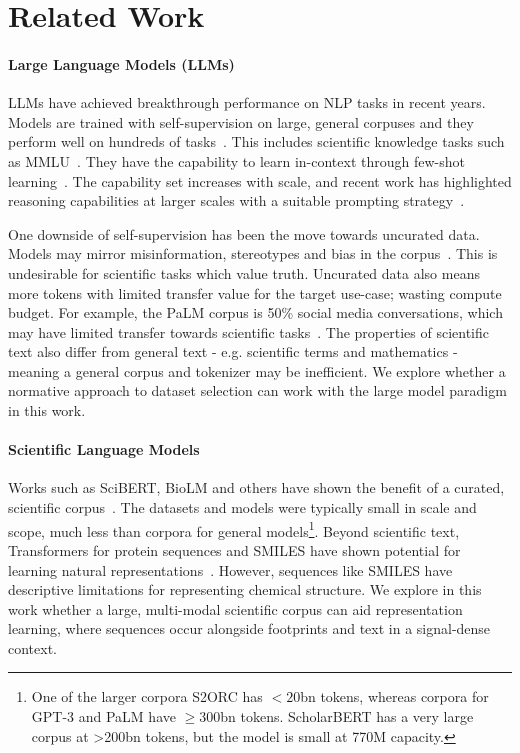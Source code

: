 \section{Related Work}

\paragraph{Large Language Models (LLMs)}LLMs have achieved breakthrough performance on NLP tasks in recent years. Models are trained with self-supervision on large, general corpuses and they perform well on hundreds of tasks~\citep{GPT3, Gopher, Chinchilla, GPTNeox, OPT, PaLM}. This includes scientific knowledge tasks such as MMLU~\citep{MMMLU}. They have the capability to learn in-context through few-shot learning~\citep{GPT3}. The capability set increases with scale, and recent work has highlighted reasoning capabilities at larger scales with a suitable prompting strategy~\citep{ChainOfThought,PaLM,StepByStep,Minerva}.

One downside of self-supervision has been the move towards uncurated data. Models may mirror misinformation, stereotypes and bias in the corpus~\citep{WomanBabysitter,MeasuringBias,MeasureMitigate,LanguageIsPower,SocietalBiases}. This is undesirable for scientific tasks which value truth. Uncurated data also means more tokens with limited transfer value for the target use-case; wasting compute budget. For example, the PaLM corpus is 50\% social media conversations, which may have limited transfer towards scientific tasks~\citep{PaLM}. The properties of scientific text also differ from general text - e.g. scientific terms and mathematics - meaning a general corpus and tokenizer may be inefficient. We explore whether a normative approach to dataset selection can work with the large model paradigm in this work.

\paragraph{Scientific Language Models}Works such as SciBERT, BioLM and others have shown the benefit of a curated, scientific corpus~\citep{SciBERT, BioLM, PubMedBERT, S2ORCBERT, PubMedBERT, BioMegatron, ScholarBERT}. The datasets and models were typically small in scale and scope,  much less than corpora for general models\footnote{One of the larger corpora S2ORC has \(<20\)bn tokens, whereas corpora for GPT-3 and PaLM have \(\geq 300\)bn tokens. ScholarBERT has a very large corpus at >200bn tokens, but the model is small at 770M capacity.}. Beyond scientific text, Transformers for protein sequences and SMILES have shown potential for learning natural representations~\citep{BioEmerge, honda2019smiles, Chemformer, ProGen2, ESMFold}. However, sequences like SMILES have descriptive limitations for representing chemical structure. We explore in this work whether a large, multi-modal scientific corpus can aid representation learning, where sequences occur alongside footprints and text in a signal-dense context.

